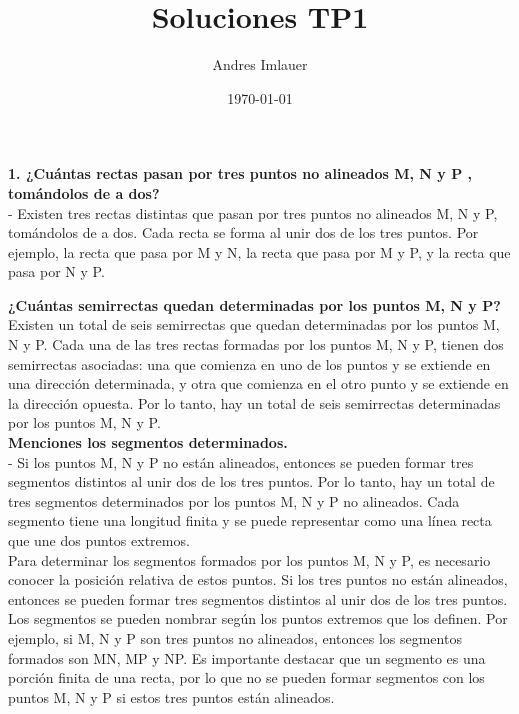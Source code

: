 \documentclass{article}
\title{Soluciones TP1}
\author{Andres Imlauer}
\date{\today}
\begin{document}
\maketitle
\thispagestyle{empty} %


{\bf 1. ¿Cuántas rectas pasan por tres puntos no alineados M, N y P , tomándolos de a dos?} \\
- Existen tres rectas distintas que pasan por tres puntos no alineados M, N y P, tomándolos de a dos. Cada recta se forma al unir dos de los tres puntos. Por ejemplo, la recta que pasa por M y N, la recta que pasa por M y P, y la recta que pasa por N y P.

{\bf ¿Cuántas semirrectas quedan determinadas por los puntos M, N y P? } \\
Existen un total de seis semirrectas que quedan determinadas por los puntos M, N y P. Cada una de las tres rectas formadas por los puntos M, N y P, tienen dos semirrectas asociadas: una que comienza en uno de los puntos y se extiende en una dirección determinada, y otra que comienza en el otro punto y se extiende en la dirección opuesta. Por lo tanto, hay un total de seis semirrectas determinadas por los puntos M, N y P.\\



{\bf Menciones los segmentos determinados.} \\
- Si los puntos M, N y P no están alineados, entonces se pueden formar tres segmentos distintos al unir dos de los tres puntos. Por lo tanto, hay un total de tres segmentos determinados por los puntos M, N y P no alineados. Cada segmento tiene una longitud finita y se puede representar como una línea recta que une dos puntos extremos. \\
Para determinar los segmentos formados por los puntos M, N y P, es necesario conocer la posición relativa de estos puntos. Si los tres puntos no están alineados, entonces se pueden formar tres segmentos distintos al unir dos de los tres puntos. Los segmentos se pueden nombrar según los puntos extremos que los definen. Por ejemplo, si M, N y P son tres puntos no alineados, entonces los segmentos formados son MN, MP y NP. Es importante destacar que un segmento es una porción finita de una recta, por lo que no se pueden formar segmentos con los puntos M, N y P si estos tres puntos están alineados. \\
\end{document}
